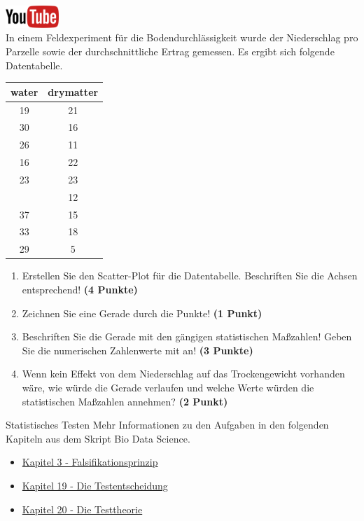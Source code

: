 \documentclass[a4paper, 10pt]{scrartcl}\usepackage[]{graphicx}\usepackage[]{xcolor}
\begin{document}
\hfill\href{https://youtu.be/VAqiUdV4WQ0}{\includegraphics[width =
  2cm]{img/youtube}}\\[1Ex]

In einem Feldexperiment f{\"u}r die Bodendurchl{\"a}ssigkeit wurde der Niederschlag
pro Parzelle sowie der durchschnittliche Ertrag gemessen. Es ergibt sich
folgende Datentabelle. 

\begin{table}[!h]
\centering
\begin{tabular}{cc}
\toprule
water & drymatter\\
\midrule
19 & 21\\
30 & 16\\
26 & 11\\
16 & 22\\
23 & 23\\
\addlinespace
26 & 12\\
37 & 15\\
33 & 18\\
29 & 5\\
\bottomrule
\end{tabular}
\end{table}



\begin{enumerate}
\item Erstellen Sie den Scatter-Plot f{\"u}r die Datentabelle. Beschriften Sie
  die Achsen entsprechend! \textbf{(4 Punkte)}
\item Zeichnen Sie eine Gerade durch die Punkte! \textbf{(1 Punkt)}
\item Beschriften Sie die Gerade mit den g{\"a}ngigen statistischen Ma{\ss}zahlen!
  Geben Sie die numerischen Zahlenwerte mit an! \textbf{(3 Punkte)}
\item Wenn kein Effekt von dem Niederschlag auf das Trockengewicht
  vorhanden w{\"a}re, wie w{\"u}rde die Gerade verlaufen und welche Werte w{\"u}rden die
  statistischen Ma{\ss}zahlen annehmen? \textbf{(2 Punkt)}
\end{enumerate} 
\clearpage
\begin{graybox}{Statistisches Testen}
Mehr Informationen zu den Aufgaben in den folgenden Kapiteln aus dem Skript Bio Data Science.
  \begin{itemize}
  \item \href{https://jkruppa.github.io/preface.html#lernziel-3-falsifikationsprinzip}{Kapitel 3 - Falsifikationsprinzip}
  \item \href{https://jkruppa.github.io/stat-tests-basic.html}{Kapitel 19 - Die Testentscheidung}
  \item \href{https://jkruppa.github.io/stat-tests-theorie.html}{Kapitel 20 - Die Testtheorie}
  \end{itemize}
\end{graybox}
\clearpage
\end{document}
